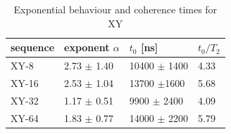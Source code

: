 \documentclass[12pt,a4paper]{article}
\begin{document}
\begin{table}[H]
\centering
\caption{Exponential behaviour and coherence times for XY}
\label{xyt}
\begin{tabular}{l|ll|l}
sequence&	exponent $\alpha$&	$t_0$ {[}ns{]}	&$t_0/T_2$\\\hline
XY-8	&2.73         $\pm$ 1.40 &	10400          $\pm$ 1400&	4.33\\
XY-16&	2.53         $\pm$ 1.04	&13700          $\pm$1600	&5.68\\
XY-32&	1.17         $\pm$ 0.51&	9900        $\pm$ 2400& 	4.09\\
XY-64&	1.83        $\pm$ 0.77	&14000         $\pm$ 2200&	5.79\\
\end{tabular}
\end{table}
\end{document}
